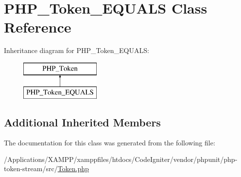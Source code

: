 \hypertarget{class_p_h_p___token___e_q_u_a_l_s}{}\section{P\+H\+P\+\_\+\+Token\+\_\+\+E\+Q\+U\+A\+LS Class Reference}
\label{class_p_h_p___token___e_q_u_a_l_s}
Inheritance diagram for P\+H\+P\+\_\+\+Token\+\_\+\+E\+Q\+U\+A\+LS\+:\begin{figure}[H]
\begin{center}
\leavevmode
\includegraphics[height=2.000000cm]{class_p_h_p___token___e_q_u_a_l_s}
\end{center}
\end{figure}
\subsection*{Additional Inherited Members}


The documentation for this class was generated from the following file\+:\begin{DoxyCompactItemize}
\item 
/\+Applications/\+X\+A\+M\+P\+P/xamppfiles/htdocs/\+Code\+Igniter/vendor/phpunit/php-\/token-\/stream/src/\mbox{\hyperlink{_token_8php}{Token.\+php}}\end{DoxyCompactItemize}
